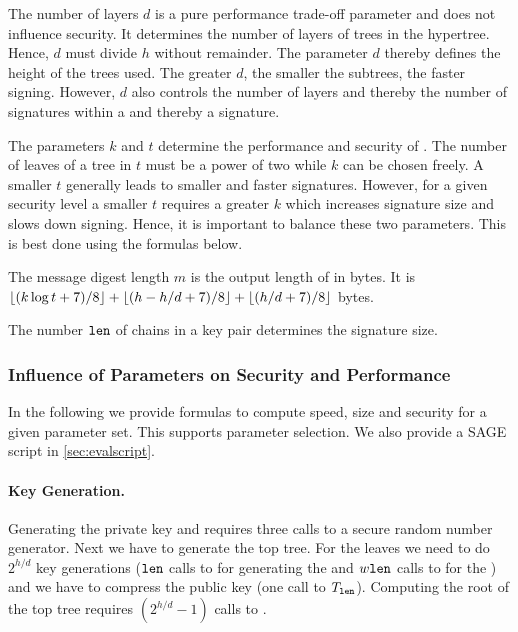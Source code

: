 The number of layers $d$ is a pure performance trade-off parameter and does not
influence security. It determines the number of layers of \xmss trees in the 
hypertree. Hence, $d$ must divide $h$ without remainder. The parameter $d$ 
thereby defines the height of the \xmss trees used. The greater $d$, the smaller
the subtrees, the faster signing. However, $d$ also controls the number of 
layers and thereby the number of \wotsp signatures within a \hyper and thereby 
a \spx signature. 

The parameters $k$ and $t$ determine the performance and security of \fors. The 
number of leaves of a tree in \fors $t$ must be a power of two while $k$ can be
chosen freely. A smaller $t$ generally leads to smaller and faster signatures.
However, for a given security level a smaller $t$ requires a greater $k$
which increases signature size and slows down signing. Hence, it is important 
to balance these two parameters. This is best done using the formulas below.

The message digest length $m$ is the output length of \sphincsHmsg in bytes. 
It is $\lfloor(k\log t +7)/ 8\rfloor + \lfloor(h - h/d +7)/ 8\rfloor + \lfloor(h / d +7)/ 8\rfloor$ 
bytes. 

The number $\texttt{len}$ of chains in a \wotsp key pair determines the \wotsp signature size.

\subsubsection{Influence of Parameters on Security and Performance}
\label{sec:generic-estimates}
In the following we provide formulas to compute speed, size and security for 
a given \spx parameter set. This supports parameter selection. We also provide
a SAGE script in \autoref{sec:evalscript}.

\paragraph{Key Generation.} Generating the \spx private key and \pseed requires 
three calls to a secure random number generator. Next we have to generate the 
top tree. For the leaves we need to do $2^{h/d}$ \wotsp key generations ($\texttt{len}$ 
calls to \sphincsPRF for generating the \sk and $w \texttt{len}$ calls to \sphincsF for the \pk) 
and we have to compress the \wotsp public key (one call to $T_\texttt{len}$). Computing 
the root of the top tree requires $(2^{h/d} - 1)$ calls to \sphincsH.

